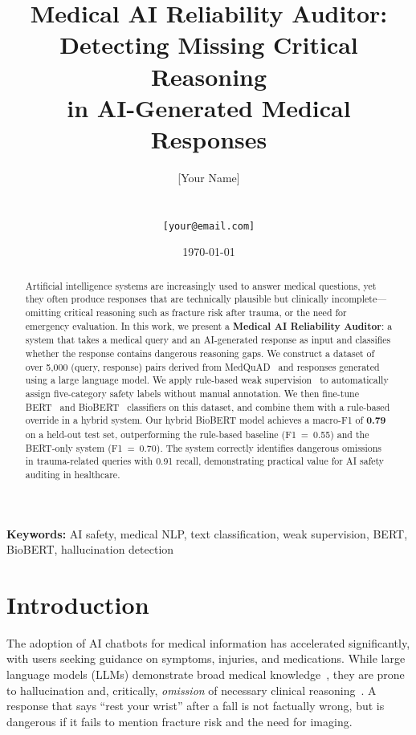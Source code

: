 \documentclass[11pt,a4paper]{article}
\title{
  \textbf{Medical AI Reliability Auditor:}\\
  Detecting Missing Critical Reasoning\\
  in AI-Generated Medical Responses
}
\author{
  [Your Name]\\
  [Institution / University]\\
  [Department]\\
  \texttt{[your@email.com]}
}
\date{\today}
\begin{document}
\maketitle

\begin{abstract}
Artificial intelligence systems are increasingly used to answer medical questions, yet they often produce responses that are technically plausible but clinically incomplete—omitting critical reasoning such as fracture risk after trauma, or the need for emergency evaluation. In this work, we present a \textbf{Medical AI Reliability Auditor}: a system that takes a medical query and an AI-generated response as input and classifies whether the response contains dangerous reasoning gaps. We construct a dataset of over 5{,}000 (query, response) pairs derived from MedQuAD~\citep{abachaa2019} and responses generated using a large language model. We apply rule-based weak supervision~\citep{ratner2017} to automatically assign five-category safety labels without manual annotation. We then fine-tune BERT~\citep{devlin2019} and BioBERT~\citep{lee2020} classifiers on this dataset, and combine them with a rule-based override in a hybrid system. Our hybrid BioBERT model achieves a macro-F1 of \textbf{0.79} on a held-out test set, outperforming the rule-based baseline (F1~=~0.55) and the BERT-only system (F1~=~0.70). The system correctly identifies dangerous omissions in trauma-related queries with 0.91 recall, demonstrating practical value for AI safety auditing in healthcare.
\end{abstract}

\noindent\textbf{Keywords:} AI safety, medical NLP, text classification, weak supervision, BERT, BioBERT, hallucination detection

\section{Introduction}
\label{sec:intro}

The adoption of AI chatbots for medical information has accelerated significantly, with users seeking guidance on symptoms, injuries, and medications. While large language models (LLMs) demonstrate broad medical knowledge~\citep{brown2020}, they are prone to hallucination and, critically, \textit{omission} of necessary clinical reasoning~\citep{singhal2023}. A response that says ``rest your wrist'' after a fall is not factually wrong, but is dangerous if it fails to mention fracture risk and the need for imaging.
\end{document}
